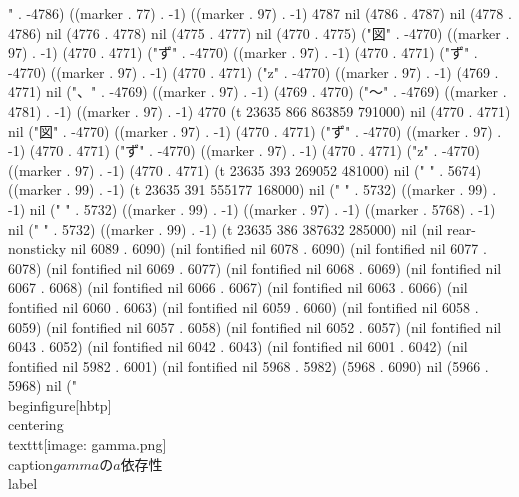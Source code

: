 " . -4786) ((marker . 77) . -1) ((marker . 97) . -1) 4787 nil (4786 . 4787) nil (4778 . 4786) nil (4776 . 4778) nil (4775 . 4777) nil (4770 . 4775) ("図" . -4770) ((marker . 97) . -1) (4770 . 4771) ("ず" . -4770) ((marker . 97) . -1) (4770 . 4771) ("ず" . -4770) ((marker . 97) . -1) (4770 . 4771) ("z" . -4770) ((marker . 97) . -1) (4769 . 4771) nil ("、" . -4769) ((marker . 97) . -1) (4769 . 4770) ("〜" . -4769) ((marker . 4781) . -1) ((marker . 97) . -1) 4770 (t 23635 866 863859 791000) nil (4770 . 4771) nil ("図" . -4770) ((marker . 97) . -1) (4770 . 4771) ("ず" . -4770) ((marker . 97) . -1) (4770 . 4771) ("ず" . -4770) ((marker . 97) . -1) (4770 . 4771) ("z" . -4770) ((marker . 97) . -1) (4770 . 4771) (t 23635 393 269052 481000) nil ("
" . 5674) ((marker . 99) . -1) (t 23635 391 555177 168000) nil ("
" . 5732) ((marker . 99) . -1) nil ("
" . 5732) ((marker . 99) . -1) ((marker . 97) . -1) ((marker . 5768) . -1) nil ("
" . 5732) ((marker . 99) . -1) (t 23635 386 387632 285000) nil (nil rear-nonsticky nil 6089 . 6090) (nil fontified nil 6078 . 6090) (nil fontified nil 6077 . 6078) (nil fontified nil 6069 . 6077) (nil fontified nil 6068 . 6069) (nil fontified nil 6067 . 6068) (nil fontified nil 6066 . 6067) (nil fontified nil 6063 . 6066) (nil fontified nil 6060 . 6063) (nil fontified nil 6059 . 6060) (nil fontified nil 6058 . 6059) (nil fontified nil 6057 . 6058) (nil fontified nil 6052 . 6057) (nil fontified nil 6043 . 6052) (nil fontified nil 6042 . 6043) (nil fontified nil 6001 . 6042) (nil fontified nil 5982 . 6001) (nil fontified nil 5968 . 5982) (5968 . 6090) nil (5966 . 5968) nil ("\\begin{figure}[hbtp]
 \\centering
 \\texttt{[image: gamma.png]}
 \\caption{$gamma$の$a$依存性}
 \\label{}

